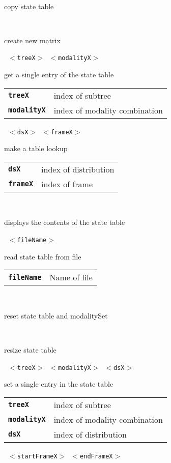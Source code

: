 \begin{description}
    \begin{description}
       \texttt{} \

        copy state table

       \texttt{} \

        create new matrix

       \texttt{ $<$treeX$>$ $<$modalityX$>$} \

        get a single entry of the state table

      \begin{tabular}{ll}
 \texttt{\textbf{treeX}} &      index of subtree  \\
 \texttt{\textbf{modalityX}} &  index of modality combination  \\
      \end{tabular}
       \texttt{ $<$dsX$>$ $<$frameX$>$} \

        make a table lookup

      \begin{tabular}{ll}
 \texttt{\textbf{dsX}} &     index of distribution  \\
 \texttt{\textbf{frameX}} &  index of frame  \\
      \end{tabular}
       \texttt{} \

        displays the contents of the state table

       \texttt{ $<$fileName$>$} \

        read state table from file

      \begin{tabular}{ll}
 \texttt{\textbf{fileName}} &  Name of file  \\
      \end{tabular}
       \texttt{} \

        reset state table and modalitySet

       \texttt{} \

        resize state table

       \texttt{ $<$treeX$>$ $<$modalityX$>$ $<$dsX$>$} \

        set a single entry in the state table

      \begin{tabular}{ll}
 \texttt{\textbf{treeX}} &      index of subtree  \\
 \texttt{\textbf{modalityX}} &  index of modality combination  \\
 \texttt{\textbf{dsX}} &        index of distribution  \\
      \end{tabular}
       \texttt{ $<$startFrameX$>$ $<$endFrameX$>$} \


\end{description}
\end{description}
